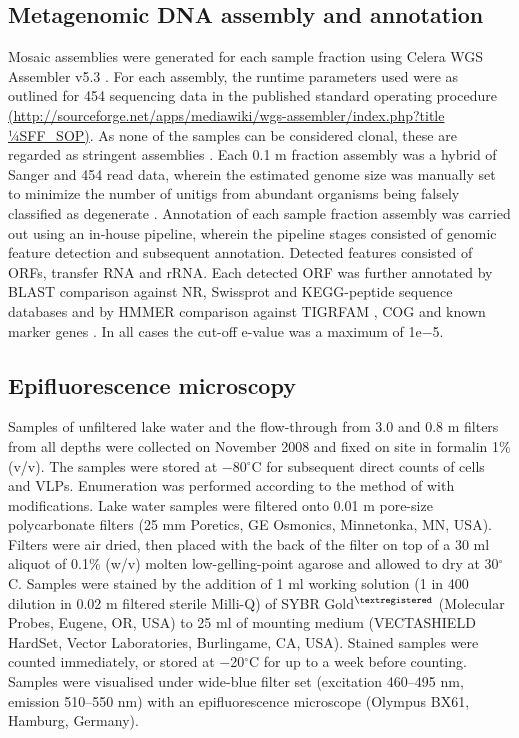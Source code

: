 \subsection{Metagenomic DNA assembly and annotation}
Mosaic assemblies were generated for each sample fraction using Celera \ac{WGS} Assembler v5.3 \cite{Myers2000}. 
For each assembly, the runtime parameters used were as outlined for 454 sequencing data in the published standard operating procedure\\ 
\url{(http://sourceforge.net/apps/mediawiki/wgs-assembler/index.php?title 1⁄4SFF\_SOP)}. 
As none of the samples can be considered clonal, these are regarded as stringent assemblies \cite{Rusch2007}. 
Each 0.1 \textmu{}m fraction assembly was a hybrid of Sanger and 454 read data, wherein the estimated genome size was manually set to minimize the number of unitigs from abundant organisms being falsely classified as degenerate \cite{Rusch2007}. 
Annotation of each sample fraction assembly was carried out using an in-house pipeline, wherein the pipeline stages consisted of genomic feature detection and subsequent annotation. 
Detected features consisted of \acp{ORF}, transfer \textsc{RNA} and \ac{rRNA}. 
Each detected \ac{ORF} was further annotated by \ac{BLAST} comparison against \ac{NR}, Swissprot and \ac{KEGG}-peptide sequence databases and by \ac{HMMER} comparison against \ac{TIGRFAM} \cite{Haft2001}, \ac{COG} \cite{Tatusov1997, Tatusov2003} and known marker genes \cite{von Mering2007}.
In all cases the cut-off e-value was a maximum of 1e$-$5. 


\subsection{Epifluorescence microscopy}
Samples of unfiltered lake water and the flow-through from 3.0 and 0.8 \textmu{}m filters from all depths were collected on November 2008 and fixed on site in formalin 1\% (v/v). 
The samples were stored at $-$80$^{\circ}$C for subsequent direct counts of cells and \acp{VLP}. 
Enumeration was performed according to the method of \citet{Patel2007} with modifications. 
Lake water samples were filtered onto 0.01 \textmu{}m pore-size polycarbonate filters (25 mm Poretics, \textsc{GE} Osmonics, Minnetonka, \textsc{MN}, \textsc{USA}). 
Filters were air dried, then placed with the back of the filter on top of a 30 ml aliquot of 0.1\% (w/v) molten low-gelling-point agarose and allowed to dry at 30$^{\circ}$C. 
Samples were stained by the addition of 1 ml working solution (1 in 400 dilution in 0.02 \textmu{}m filtered sterile Milli-Q) of \textsc{SYBR} Gold$^{\textregistered}$ (Molecular Probes, Eugene, \textsc{OR}, \textsc{USA}) to 25 ml of mounting medium (\textsc{VECTASHIELD} HardSet, Vector Laboratories, Burlingame, \textsc{CA}, \textsc{USA}). 
Stained samples were counted immediately, or stored at $-$20$^{\circ}$C for up to a week before counting. 
Samples were visualised under wide-blue filter set (excitation 460--495 nm, emission 510--550 nm) with an epifluorescence microscope (Olympus BX61, Hamburg, Germany).


